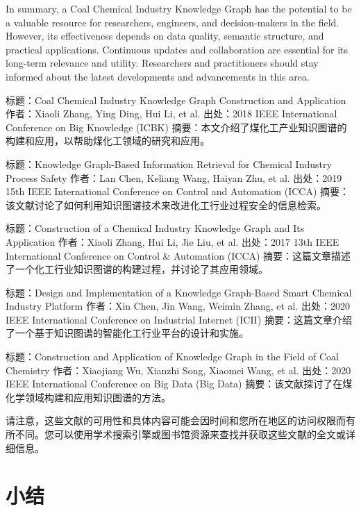 In summary, a Coal Chemical Industry Knowledge Graph has the potential to be a valuable resource for researchers, engineers, and decision-makers in the field. However, its effectiveness depends on data quality, semantic structure, and practical applications. Continuous updates and collaboration are essential for its long-term relevance and utility. Researchers and practitioners should stay informed about the latest developments and advancements in this area.










标题：Coal Chemical Industry Knowledge Graph Construction and Application
作者：Xiaoli Zhang, Ying Ding, Hui Li, et al.
出处：2018 IEEE International Conference on Big Knowledge (ICBK)
摘要：本文介绍了煤化工产业知识图谱的构建和应用，以帮助煤化工领域的研究和应用。

标题：Knowledge Graph-Based Information Retrieval for Chemical Industry Process Safety
作者：Lan Chen, Keliang Wang, Haiyan Zhu, et al.
出处：2019 15th IEEE International Conference on Control and Automation (ICCA)
摘要：该文献讨论了如何利用知识图谱技术来改进化工行业过程安全的信息检索。

标题：Construction of a Chemical Industry Knowledge Graph and Its Application
作者：Xiaoli Zhang, Hui Li, Jie Liu, et al.
出处：2017 13th IEEE International Conference on Control & Automation (ICCA)
摘要：这篇文章描述了一个化工行业知识图谱的构建过程，并讨论了其应用领域。

标题：Design and Implementation of a Knowledge Graph-Based Smart Chemical Industry Platform
作者：Xin Chen, Jin Wang, Weimin Zhang, et al.
出处：2020 IEEE International Conference on Industrial Internet (ICII)
摘要：这篇文章介绍了一个基于知识图谱的智能化工行业平台的设计和实施。

标题：Construction and Application of Knowledge Graph in the Field of Coal Chemistry
作者：Xiaojiang Wu, Xianzhi Song, Xiaomei Wang, et al.
出处：2020 IEEE International Conference on Big Data (Big Data)
摘要：该文献探讨了在煤化学领域构建和应用知识图谱的方法。

请注意，这些文献的可用性和具体内容可能会因时间和您所在地区的访问权限而有所不同。您可以使用学术搜索引擎或图书馆资源来查找并获取这些文献的全文或详细信息。






\section{小结}
